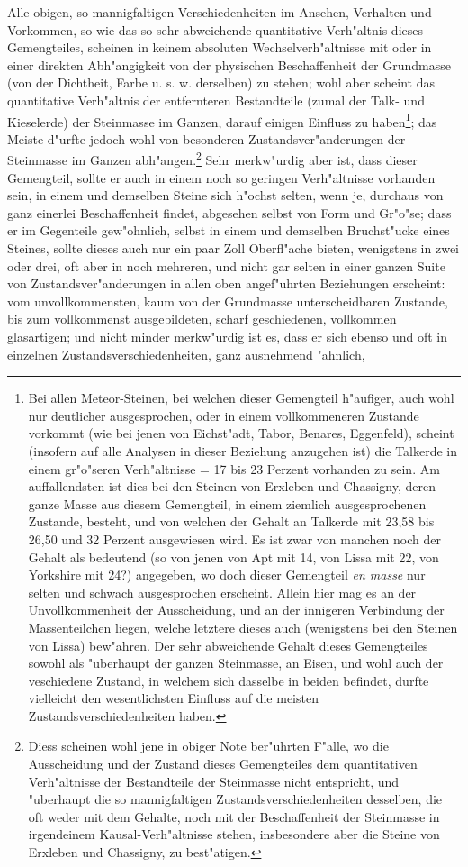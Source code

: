 \documentclass[a4paper, 11pt, oneside, german]{article}
\begin{document}
Alle obigen, so mannigfaltigen Verschiedenheiten im Ansehen, Verhalten und Vorkommen, so wie das so sehr abweichende quantitative Verh"altnis dieses Gemengteiles, scheinen in keinem absoluten Wechselverh"altnisse mit oder in einer direkten Abh"angigkeit von der physischen Beschaffenheit der Grundmasse (von der Dichtheit, Farbe u. s. w. derselben) zu stehen; wohl aber scheint das quantitative Verh"altnis der entfernteren Bestandteile (zumal der Talk- und Kieselerde) der Steinmasse im Ganzen, darauf einigen Einfluss zu haben\footnote{Bei allen Meteor-Steinen, bei welchen dieser Gemengteil h"aufiger, auch wohl nur deutlicher ausgesprochen, oder in einem vollkommeneren Zustande vorkommt (wie bei jenen von Eichst"adt, Tabor, Benares, Eggenfeld), scheint (insofern auf alle Analysen in dieser Beziehung anzugehen ist) die Talkerde in einem gr"o"seren Verh"altnisse = 17 bis 23 Perzent vorhanden zu sein. Am auffallendsten ist dies bei den Steinen von Erxleben und Chassigny, deren ganze Masse aus diesem Gemengteil, in einem ziemlich ausgesprochenen Zustande, besteht, und von welchen der Gehalt an Talkerde mit 23,58 bis 26,50 und 32 Perzent ausgewiesen wird. Es ist zwar von manchen noch der Gehalt als bedeutend (so von jenen von Apt mit 14, von Lissa mit 22, von Yorkshire mit 24?) angegeben, wo doch dieser Gemengteil \emph{en masse} nur selten und schwach ausgesprochen erscheint. Allein hier mag es an der Unvollkommenheit der Ausscheidung, und an der innigeren Verbindung der Massenteilchen liegen, welche letztere dieses auch (wenigstens bei den Steinen von Lissa) bew"ahren. Der sehr abweichende Gehalt dieses Gemengteiles sowohl als "uberhaupt der ganzen Steinmasse, an Eisen, und wohl auch der veschiedene Zustand, in welchem sich dasselbe in beiden befindet, durfte vielleicht den wesentlichsten Einfluss auf die meisten Zustandsverschiedenheiten haben.}; das Meiste d"urfte jedoch wohl von besonderen Zustandsver"anderungen der Steinmasse im Ganzen abh"angen.\footnote{Diess scheinen wohl jene in obiger Note ber"uhrten F"alle, wo die Ausscheidung und der Zustand dieses Gemengteiles dem quantitativen Verh"altnisse der Bestandteile der Steinmasse nicht entspricht, und "uberhaupt die so mannigfaltigen Zustandsverschiedenheiten desselben, die oft weder mit dem Gehalte, noch mit der Beschaffenheit der Steinmasse in irgendeinem Kausal-Verh"altnisse stehen, insbesondere aber die Steine von Erxleben und Chassigny, zu best"atigen.} Sehr merkw"urdig aber ist, dass dieser Gemengteil, sollte er auch in einem noch so geringen Verh"altnisse vorhanden sein, in einem und demselben Steine sich h"ochst selten, wenn je, durchaus von ganz einerlei Beschaffenheit findet, abgesehen selbst von Form und Gr"o"se; dass er im Gegenteile gew"ohnlich, selbst in einem und demselben Bruchst"ucke eines Steines, sollte dieses auch nur ein paar Zoll Oberfl"ache bieten, wenigstens in zwei oder drei, oft aber in noch mehreren, und nicht gar selten in einer ganzen Suite von Zustandsver"anderungen in allen oben angef"uhrten Beziehungen erscheint: vom unvollkommensten, kaum von der Grundmasse unterscheidbaren Zustande, bis zum vollkommenst ausgebildeten, scharf geschiedenen, vollkommen glasartigen; und nicht minder merkw"urdig ist es, dass er sich ebenso und oft in einzelnen Zustandsverschiedenheiten, ganz ausnehmend "ahnlich, 
\end{document}
